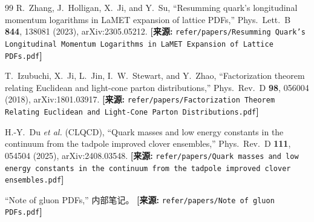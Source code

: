 \documentclass[12pt,a4paper]{ctexart}
\theoremstyle{definition}
\begin{document}
\begin{thebibliography}{99}
R.~Zhang, J.~Holligan, X.~Ji, and Y.~Su,
``Resumming quark's longitudinal momentum logarithms in LaMET expansion of lattice PDFs,''
Phys.\ Lett.\ B \textbf{844}, 138081 (2023), arXiv:2305.05212.
\quad\textbf{[来源:} \texttt{refer/papers/Resumming Quark's Longitudinal Momentum Logarithms in LaMET Expansion of Lattice PDFs.pdf}\textbf{]}

T.~Izubuchi, X.~Ji, L.~Jin, I.~W.~Stewart, and Y.~Zhao,
``Factorization theorem relating Euclidean and light-cone parton distributions,''
Phys.\ Rev.\ D \textbf{98}, 056004 (2018), arXiv:1801.03917.
\quad\textbf{[来源:} \texttt{refer/papers/Factorization Theorem Relating Euclidean and Light-Cone Parton Distributions.pdf}\textbf{]}

H.-Y.~Du \textit{et al.} (CLQCD),
``Quark masses and low energy constants in the continuum from the tadpole improved clover ensembles,''
Phys.\ Rev.\ D \textbf{111}, 054504 (2025), arXiv:2408.03548.
\quad\textbf{[来源:} \texttt{refer/papers/Quark masses and low energy constants in the continuum from the tadpole improved clover ensembles.pdf}\textbf{]}

``Note of gluon PDFs,''
内部笔记。
\quad\textbf{[来源:} \texttt{refer/papers/Note of gluon PDFs.pdf}\textbf{]}

\end{thebibliography}
\end{document}
